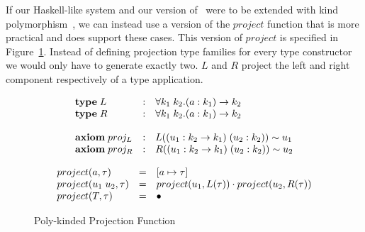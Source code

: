 If our Haskell-like system and our version of \systemfc~were to be extended
with kind polymorphism~\cite{yorgey}, we can instead use a version of the
$project$ function that is more practical and does support these cases. This
version of $project$ is specified in Figure~\ref{fig:poly-project}. Instead of
defining projection type families for every type constructor we would only have
to generate exactly two. $L$ and $R$ project the left and right component
respectively of a type application.

\[
\begin{array}{l c l}
    \textbf{type} \; L &: &\forall k_1 \; k_2. (a : k_1) \rightarrow k_2
    \\
    \textbf{type} \; R &: &\forall k_1 \; k_2. (a : k_1) \rightarrow k_2
    \\
    \\
    \textbf{axiom} \; proj_L &:& L((u_1 : k_2 \rightarrow k_1) \; (u_2 : k_2))
    \sim u_1
    \\
    \textbf{axiom} \; proj_R &:& R((u_1 : k_2 \rightarrow k_1) \; (u_2 : k_2))
    \sim u_2
\end{array}
\]
\begin{figure}
\[
\begin{array}{l c l}

    project(a, \tau) & = & [a \mapsto \tau]
    \\
    project(u_1 \; u_2, \tau) & = &
    project(u_1, L(\tau)) \cdot project(u_2, R(\tau))
    \\
    project(T, \tau) & = & \bullet
\end{array}
\]
\caption{Poly-kinded Projection Function}
\label{fig:poly-project}
\end{figure}
